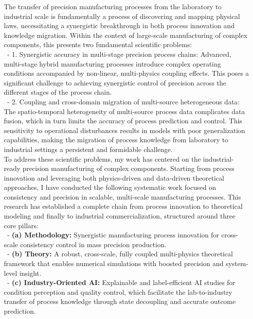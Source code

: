 \documentclass{ResearchStatement}
\begin{document}
The transfer of precision manufacturing processes from the laboratory to industrial scale is fundamentally a process of discovering and mapping physical laws, necessitating a synergistic breakthrough in both process innovation and knowledge migration. Within the context of large-scale manufacturing of complex components, this presents two fundamental scientific problems:\\
\, - 1. Synergistic accuracy in multi-stage precision process chains: Advanced, multi-stage hybrid manufacturing processes introduce complex operating conditions accompanied by non-linear, multi-physics coupling effects. This poses a significant challenge to achieving synergistic control of precision across the different stages of the process chain.\\
\, - 2. Coupling and cross-domain migration of multi-source heterogeneous data: The spatio-temporal heterogeneity of multi-source process data complicates data fusion, which in turn limits the accuracy of process prediction and control. This sensitivity to operational disturbances results in models with poor generalization capabilities, making the migration of process knowledge from laboratory to industrial settings a persistent and formidable challenge.\\
To address these scientific problems, my work has centered on the industrial-ready precision manufacturing of complex components. Starting from process innovation and leveraging both physics-driven and data-driven theoretical approaches, I have conducted the following systematic work focused on consistency and precision in scalable, multi-scale manufacturing processes. This research has established a complete chain from process innovation to theoretical modeling and finally to industrial commercialization, structured around three core pillars:\\
\, - \textbf{(a) Methodology:} Synergistic manufacturing process innovation for cross-scale consistency control in mass precision production.\\
\, - \textbf{(b) Theory:} A robust, cross-scale, fully coupled multi-physics theoretical framework that enables numerical simulations with boosted precision and system-level insight.\\
\, - \textbf{(c) Industry-Oriented AI:} Explainable and label-efficient AI studies for condition perception and quality control, which facilitate the lab-to-industry transfer of process knowledge through state decoupling and accurate outcome prediction.\\
\end{document}
